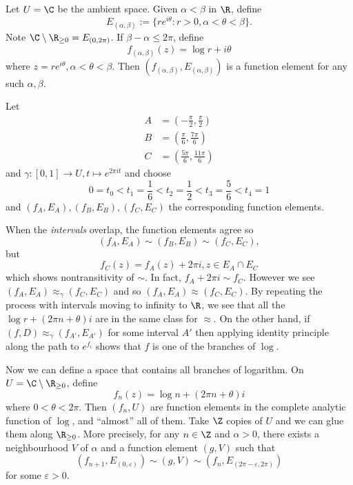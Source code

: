 \documentclass[a4paper]{article}
\begin{document}
\begin{eg}
  Let \(U = \C\) be the ambient space. Given \(\alpha < \beta\) in \(\R\), define
  \[
    E_{(\alpha, \beta)} := \{r e^{i \theta}: r > 0, \alpha < \theta < \beta\}.
  \]
  Note \(\C \setminus \R_{\geq 0} = E_{(0, 2\pi)}\). If \(\beta - \alpha \leq 2\pi\), define
  \[
    f_{(\alpha, \beta)}(z) = \log r + i\theta
  \]
  where \(z = re^{i\theta}, \alpha < \theta < \beta\). Then \((f_{(\alpha, \beta)}, E_{(\alpha, \beta)})\) is a function element for any such \(\alpha, \beta\).

  Let
  \begin{align*}
    A &= (-\frac{\pi}{2}, \frac{\pi}{2}) \\
    B &= (\frac{\pi}{6}, \frac{7\pi}{6}) \\
    C &= (\frac{5\pi}{6}, \frac{11\pi}{6})
  \end{align*}
  and \(\gamma: [0, 1] \to U, t \mapsto e^{2\pi i t}\) and choose
  \[
    0 = t_0 < t_1 = \frac{1}{6} < t_2 = \frac{1}{2} < t_3 = \frac{5}{6} < t_4 = 1
  \]
  and \((f_A, E_A), (f_B, E_B), (f_C, E_C)\) the corresponding function elements.

  When the \emph{intervals} overlap, the function elements agree so
  \[
    (f_A, E_A) \sim (f_B, E_B) \sim (f_C, E_C),
  \]
  but
  \[
    f_C(z) = f_A(z) + 2\pi i, z \in E_A \cap E_C
  \]
  which shows nontransitivity of \(\sim\). In fact, \(f_A + 2\pi i \sim f_C\). However we see \((f_A, E_A) \approx_\gamma (f_C, E_C)\) and so \((f_A, E_A) \approx (f_C, E_C)\). By repeating the process with intervals moving to infinity to \(\R\), we see that all the \(\log r + (2\pi n + \theta) i\) are in the same class for \(\approx\). On the other hand, if \((f, D) \approx_\gamma (f_{A'}, E_{A'})\) for some interval \(A'\) then applying identity principle along the path to \(e^{f_i}\) shows that \(f\) is one of the branches of \(\log\).

  Now we can define a space that contains all branches of logarithm. On \(U = \C \setminus \R_{\geq 0}\), define
  \[
    f_n(z) = \log n + (2\pi n + \theta)i
  \]
  where \(0 < \theta < 2\pi\). Then \((f_n, U)\) are function elements in the complete analytic function of \(\log\), and ``almost'' all of them. Take \(\Z\) copies of \(U\) and we can glue them along \(\R_{\geq 0}\). More precisely, for any \(n \in \Z\) and \(\alpha > 0\), there exists a neighbourhood \(V\) of \(\alpha\) and a function element \((g, V)\) such that
  \[
    (f_{n + 1}, E_{(0, \varepsilon)}) \sim (g, V) \sim (f_n, E_{(2\pi - \varepsilon, 2\pi)})
  \]
  for some \(\varepsilon > 0\).


\end{eg}
\end{document}
